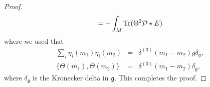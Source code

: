 \documentclass[letterpaper,11pt]{article}
\newcommand{\nn}{\nonumber}
\def\d{\delta}
\def\cd{{\cal D}}
\begin{document}
\begin{proof}
\begin{equation*}
=- \int_M \mbox{Tr} (\Theta^2  \cd\star {E} ) 
\end{equation*}
where we used that 
\begin{eqnarray}
\sum_i {\eta}_i(m_1) {\eta}_i(m_2) &=& \d^{(3)}(m_1 - m_2)g \d_{\mathfrak{g}},
\nn\\
\{\Theta(m_1), \bar{\Theta}(m_2)\} &=& \d^{(3)}(m_1-m_2) \d_{\mathfrak{g}},
\nn
\end{eqnarray}
where $\d_{\mathfrak{g}}$ is the Kronecker delta in $\mathfrak{g}$.
This completes the proof.
\end{proof}
\end{document}
